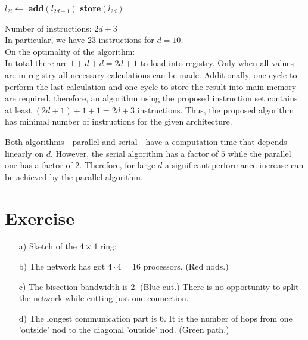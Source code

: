 \documentclass{article}
\begin{document}
\begin{enumerate}[label=(\alph*)]
\begin{algorithmic}[1]
      \State $l_{2i} \gets $ \textbf{add}$(l_{2d-1})$
      \State \textbf{store}$(l_{2d})$
    \end{algorithmic}
    Number of instructions: $2d+3$ \\
    In particular, we have 23 instructions for $d = 10$. \\
    On the optimality of the algorithm: \\
    In total there are $1+d+d = 2d +1 $ to load into registry. Only when all values are in registry all necessary calculations can be made. Additionally, one cycle to perform the last calculation and one cycle to store the result into main memory are required. therefore, an algorithm using the proposed instruction set contains at least $(2d+1) + 1 + 1 = 2d + 3$ instructions. Thus, the proposed algorithm has minimal number of instructions for the given architecture. 

    Both algorithms - parallel and serial - have a computation time that depends linearly on $d$. However, the serial algorithm has a factor of $5$ while the parallel one has a factor of $2$. Therefore, for large $d$ a significant performance increase can be achieved by the parallel algorithm.
\end{enumerate}

\section{Exercise}
\begin{itemize}
    \item[a)] Sketch of the $4\times 4$ ring:
    \newpage
    \item[b)] The network has got $4\cdot 4 =16$ processors. (Red nods.)
    \item[c)] The bisection bandwidth is 2. (Blue cut.) There is no opportunity to split the network while cutting just one connection.
    \item[d)] The longest communication part is 6. It is the number of hops from one 'outside' nod to the diagonal 'outside' nod. (Green path.)
\end{itemize} 





\end{document}
